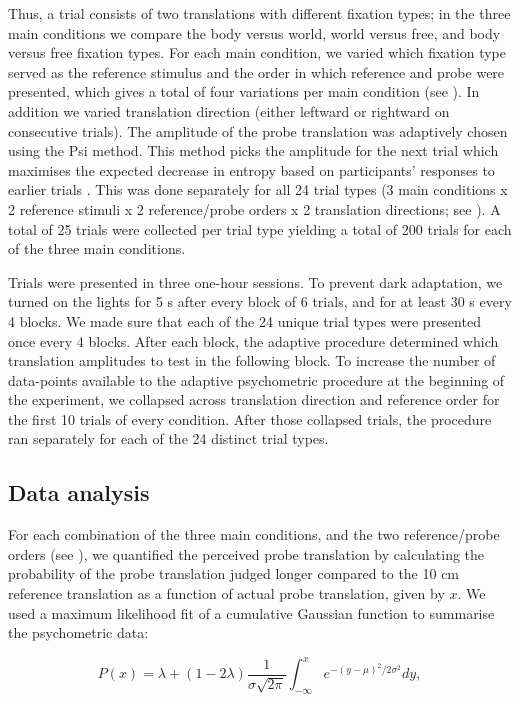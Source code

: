 Thus, a trial consists of two translations with different fixation types; in the three main conditions we compare the body versus world, world versus free, and body versus free fixation types. For each main condition, we varied which fixation type served as the reference stimulus and the order in which reference and probe were presented, which gives a total of four variations per main condition (see ). In addition we varied translation direction (either leftward or rightward on consecutive trials). The amplitude of the probe translation was adaptively chosen using the Psi method. This method picks the amplitude for the next trial which maximises the expected decrease in entropy based on participants' responses to earlier trials \cite{kontsevich1999}. This was done separately for all 24 trial types (3 main conditions x 2 reference stimuli x 2 reference/probe orders x 2 translation directions; see ). A total of 25 trials were collected per trial type yielding a total of 200 trials for each of the three main conditions.

Trials were presented in three one-hour sessions. To prevent dark adaptation, we turned on the lights for 5 \si{\second} after every block of 6 trials, and for at least 30 \si{\second} every 4 blocks. We made sure that each of the 24 unique trial types were presented once every 4 blocks. After each block, the adaptive procedure determined which translation amplitudes to test in the following block. To increase the number of data-points available to the adaptive psychometric procedure at the beginning of the experiment, we collapsed across translation direction and reference order for the first 10 trials of every condition. After those collapsed trials, the procedure ran separately for each of the 24 distinct trial types.

\subsection{Data analysis}

For each combination of the three main conditions, and  the two reference/probe orders (see ), we quantified the perceived probe translation  by calculating the probability of the probe translation judged longer compared to the 10 \si{\centi\metre} reference translation as a function of actual probe translation, given by $x$. We used a maximum likelihood fit of a cumulative Gaussian function to summarise the psychometric data:

\begin{equation}
\label{p3:eq1}
P(x) = \lambda + (1 - 2\lambda) \frac{1}{\sigma \sqrt{2\pi}} \int_{-\infty}^{x}{e^{-(y-\mu)^2 / 2\sigma^2}}dy,
\end{equation}

